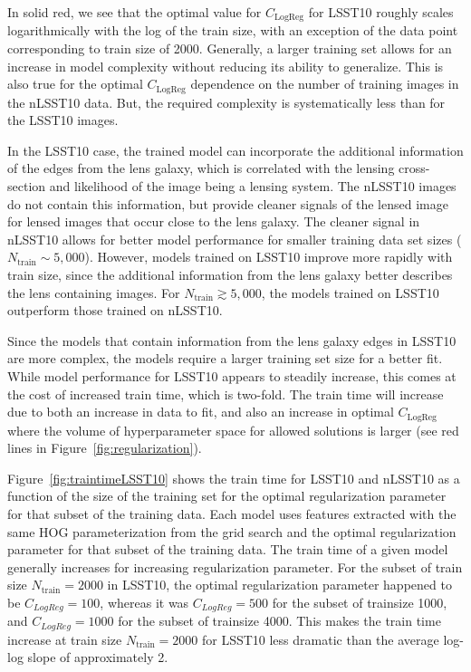 \documentclass{emulateapj}
\def\gsim{\gtrsim}
\begin{document}
In solid red, we see that the optimal value for $C_\text{LogReg}$ for
LSST10 roughly scales logarithmically with the log of the train size,
with an exception of the data point corresponding to train size of
2000.  Generally, a larger training set allows for an increase in
model complexity without reducing its ability to generalize.  This is
also true for the optimal $C_\text{LogReg}$ dependence on the number
of training images in the nLSST10 data.  But, the required complexity
is systematically less than for the LSST10 images.  

In the LSST10 case, the trained model can incorporate the additional
information of the edges from the lens galaxy, which is correlated
with the lensing cross-section and likelihood of the image being a
lensing system.  The nLSST10 images do not contain this information,
but provide cleaner signals of the lensed image for lensed images that
occur close to the lens galaxy.  The cleaner signal in nLSST10 allows
for better model performance for smaller training data set sizes
($N_\text{train}\sim5,000$).  However, models trained on LSST10
improve more rapidly with train size, since the additional information
from the lens galaxy better describes the lens containing images.  For
$N_\text{train}\gsim 5,000$, the models trained on LSST10 outperform
  those trained on nLSST10.

Since the models that contain information from the lens galaxy edges
in LSST10 are more complex, the models require a larger training set
size for a better fit.  While model performance for LSST10 appears to
steadily increase, this comes at the cost of increased train time,
which is two-fold.  The train time will increase due to both an
increase in data to fit, and also an increase in optimal
$C_\text{LogReg}$ where the volume of hyperparameter space for allowed
solutions is larger (see red lines in
Figure~\ref{fig:regularization}).

Figure~\ref{fig:traintimeLSST10} shows the train time for LSST10 and
nLSST10 as a function of the size of the training set for the optimal
regularization parameter for that subset of the training data.  Each model
uses features extracted with the same HOG parameterization from the
grid search and the optimal regularization parameter for that subset of
the training data.  The train time of a given model generally increases for
increasing regularization parameter.  For the subset of train size
$N_\text{train}=2000$ in LSST10, the optimal regularization parameter
happened to be $C_{LogReg}=100$, whereas it was $C_{LogReg}=500$ for
the subset of trainsize 1000, and $C_{LogReg}=1000$ for the subset of
trainsize 4000.  This makes the train time increase at train size
$N_\text{train}=2000$ for LSST10 less dramatic than the average
log-log slope of approximately 2.
\end{document}
